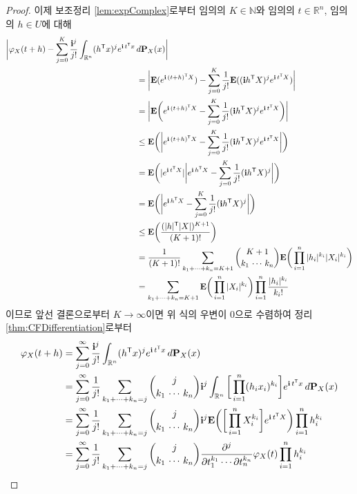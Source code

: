 \begin{proof}
    이제 보조정리 \ref{lem:expComplex}로부터 임의의 $K\in\mathbb{N}$와 임의의 $t\in\mathbb{R}^n$, 임의의 $h\in U$에 대해
    \begin{align*}
        \bigg|\varphi_X(t+h)-\sum_{j=0}^K\frac{\mathbf{i}^j}{j!}\int_{\mathbb{R}^n}(h^{\mathsf{T}} x)^je^{\mathbf{i}\,t^{\mathsf{T}} x}\,&d\mathbf{P}_X(x)\bigg|\\
        &=\bigg|\mathbf{E}(e^{\mathbf{i}\,(t+h)^{\mathsf{T}} X})-\sum_{j=0}^K\frac{1}{j!}\mathbf{E}((\mathbf{i} h^{\mathsf{T}} X)^je^{\mathbf{i}\,t^{\mathsf{T}} X})\bigg|\\
        &=\bigg|\mathbf{E}\bigg(e^{\mathbf{i}\,(t+h)^{\mathsf{T}} X}-\sum_{j=0}^K\frac{1}{j!}(\mathbf{i} h^{\mathsf{T}} X)^je^{\mathbf{i}\,t^{\mathsf{T}} X}\bigg)\bigg|\\
        &\leq\mathbf{E}\bigg(\bigg|e^{\mathbf{i}\,(t+h)^{\mathsf{T}} X}-\sum_{j=0}^K\frac{1}{j!}(\mathbf{i} h^{\mathsf{T}} X)^je^{\mathbf{i}\,t^{\mathsf{T}} X}\bigg|\bigg)\\
        &=\mathbf{E}\bigg(|e^{\mathbf{i}\,t^{\mathsf{T}} X}|\bigg|e^{\mathbf{i}\,h^{\mathsf{T}} X}-\sum_{j=0}^K\frac{1}{j!}(\mathbf{i} h^{\mathsf{T}} X)^j\bigg|\bigg)\\
        &=\mathbf{E}\bigg(\bigg|e^{\mathbf{i}\,h^{\mathsf{T}} X}-\sum_{j=0}^K\frac{1}{j!}(\mathbf{i} h^{\mathsf{T}} X)^j\bigg|\bigg)\\
        &\leq\mathbf{E}\bigg(\frac{(|h|^{\mathsf{T}}|X|)^{K+1}}{(K+1)!}\bigg)\\
        &=\frac{1}{(K+1)!}\sum_{k_1+\cdots+k_n=K+1}\binom{K+1}{k_1\,\cdots\,k_n}\mathbf{E}\bigg(\prod_{i=1}^n|h_i|^{k_i}|X_i|^{k_i}\bigg)\\
        &=\sum_{k_1+\cdots+k_n=K+1}\mathbf{E}\bigg(\prod_{i=1}^n|X_i|^{k_i}\bigg)\prod_{i=1}^n\frac{|h_i|^{k_i}}{k_i!}
    \end{align*}
    이므로 앞선 결론으로부터 $K\to\infty$이면 위 식의 우변이 $0$으로 수렴하여 정리 \ref{thm:CFDifferentiation}로부터
    \begin{align*}
        \varphi_X(t+h)&=\sum_{j=0}^\infty\frac{\imag^j}{j!}\int_{\mathbb{R}^n}(h^\trans x)^je^{\imag\,t^\trans x}\,d\prob_X(x)\\
        &=\sum_{j=0}^\infty\frac{1}{j!}\sum_{k_1+\cdots+k_n=j}\binom{j}{k_1\,\cdots\,k_n}\imag^j\int_{\mathbb{R}^n}\bigg[\prod_{i=1}^n(h_ix_i)^{k_i}\bigg]e^{\imag\,t^\trans x}\,d\prob_X(x)\\
        &=\sum_{j=0}^\infty\frac{1}{j!}\sum_{k_1+\cdots+k_n=j}\binom{j}{k_1\,\cdots\,k_n}\imag^j\expect\bigg(\bigg[\prod_{i=1}^nX_i^{k_i}\bigg]e^{\imag\,t^\trans X}\bigg)\prod_{i=1}^nh_i^{k_i}\\
        &=\sum_{j=0}^\infty\frac{1}{j!}\sum_{k_1+\cdots+k_n=j}\binom{j}{k_1\,\cdots\,k_n}\frac{\partial^j}{\partial t_1^{k_1}\cdots\partial t_n^{k_n}}\varphi_X(t)\prod_{i=1}^nh_i^{k_i}\\

\end{align*}
\end{proof}

